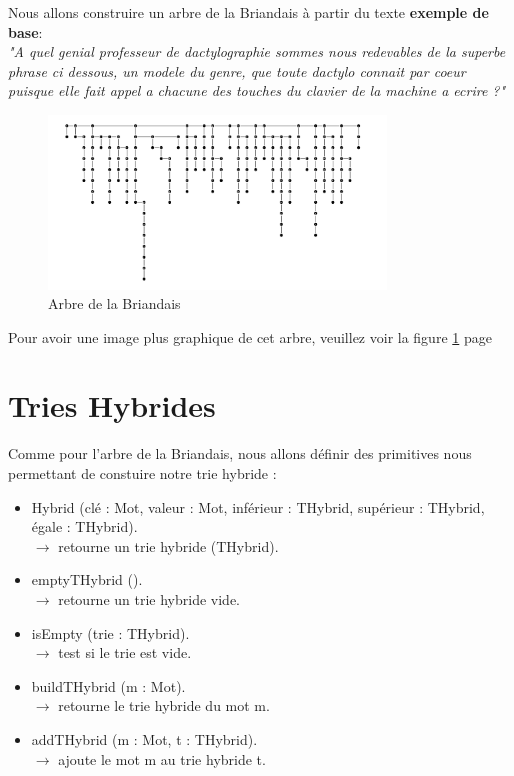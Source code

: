 \documentclass[a4paper,8pt]{report}
\begin{document}
Nous allons construire un arbre de la Briandais \`a partir du texte \textbf{exemple de base}:\\
\textit{"A quel genial professeur de dactylographie sommes nous redevables de la superbe phrase ci dessous, un modele du genre, que toute dactylo connait par coeur puisque elle fait appel a chacune des touches du clavier de la machine a ecrire ?"}

\begin{figure}[H]
  \centering
  \includegraphics[width=0.8\textwidth]{briandais.png}
  \caption{Arbre de la Briandais}
  \label{fig:Arbre de la Briandais}
\end{figure}
\medskip
Pour avoir une image plus graphique de cet arbre, veuillez voir la figure \ref{fig:Arbre de la Briandais} page~\pageref{fig:Arbre de la Briandais}

\section*{Tries Hybrides}\label{sec:name}

Comme pour l'arbre de la Briandais, nous allons d\'efinir des primitives nous permettant de constuire notre trie hybride :\\
\begin{itemize}
\item Hybrid (cl\'e : Mot, valeur : Mot, inf\'erieur : THybrid, sup\'erieur : THybrid, \'egale : THybrid).\\
  $\rightarrow$ retourne un trie hybride (THybrid).\\
\item emptyTHybrid ().\\
  $\rightarrow$ retourne un trie hybride vide.\\
\item isEmpty (trie : THybrid).\\
  $\rightarrow$ test si le trie est vide.\\
\item buildTHybrid (m : Mot).\\
  $\rightarrow$ retourne le trie hybride du mot m.\\
\item addTHybrid (m : Mot, t : THybrid).\\
  $\rightarrow$ ajoute le mot m au trie hybride t.\\
\end{itemize}
\end{document}
